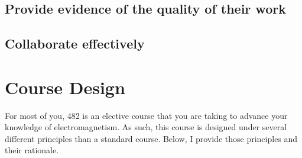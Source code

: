 \documentclass[letterpaper,10pt,english]{jupyterBook}
\begin{document}
\subsection{Provide evidence of the quality of their work}
\label{\detokenize{content/0_course/goals:provide-evidence-of-the-quality-of-their-work}}

\subsection{Collaborate effectively}
\label{\detokenize{content/0_course/goals:collaborate-effectively}}
\sphinxstepscope


\section{Course Design}
\label{\detokenize{content/0_course/design:course-design}}\label{\detokenize{content/0_course/design::doc}}
\sphinxAtStartPar
For most of you, 482 is an elective course that you are taking to advance your knowledge of electromagnetism. As such, this course is designed under several different principles than a standard course. Below, I provide those principles and their rationale.
\end{document}
